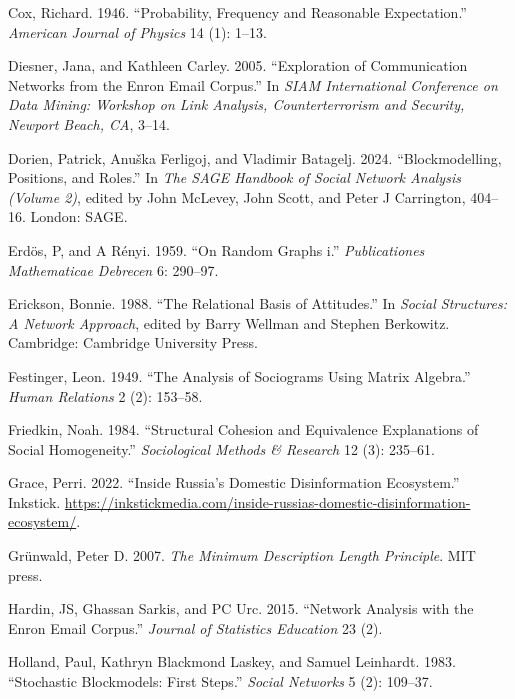 \documentclass[
  12pt,
  a4paper,
  DIV=11,
  numbers=noendperiod,
  twoside,
  open=any]{scrartcl}
\newlength{\cslhangindent}
\newenvironment{CSLReferences}[2] %
 {\begin{list}{}{%
  \setlength{\itemindent}{0pt}
  \setlength{\leftmargin}{0pt}
  \setlength{\parsep}{0pt}
  \ifodd #1
   \setlength{\leftmargin}{\cslhangindent}
   \setlength{\itemindent}{-1\cslhangindent}
  \fi
  \setlength{\itemsep}{#2\baselineskip}}}
 {\end{list}}
\begin{document}
\begin{CSLReferences}{1}{0}
Cox, Richard. 1946. {``Probability, Frequency and Reasonable
Expectation.''} \emph{American Journal of Physics} 14 (1): 1--13.

Diesner, Jana, and Kathleen Carley. 2005. {``Exploration of
Communication Networks from the Enron Email Corpus.''} In \emph{SIAM
International Conference on Data Mining: Workshop on Link Analysis,
Counterterrorism and Security, Newport Beach, CA}, 3--14.

Dorien, Patrick, Anuška Ferligoj, and Vladimir Batagelj. 2024.
{``Blockmodelling, Positions, and Roles.''} In \emph{The SAGE Handbook
of Social Network Analysis (Volume 2)}, edited by John McLevey, John
Scott, and Peter J Carrington, 404--16. London: SAGE.

Erdös, P, and A Rényi. 1959. {``On Random Graphs i.''}
\emph{Publicationes Mathematicae Debrecen} 6: 290--97.

Erickson, Bonnie. 1988. {``The Relational Basis of Attitudes.''} In
\emph{Social Structures: A Network Approach}, edited by Barry Wellman
and Stephen Berkowitz. Cambridge: Cambridge University Press.

Festinger, Leon. 1949. {``The Analysis of Sociograms Using Matrix
Algebra.''} \emph{Human Relations} 2 (2): 153--58.

Friedkin, Noah. 1984. {``Structural Cohesion and Equivalence
Explanations of Social Homogeneity.''} \emph{Sociological Methods \&
Research} 12 (3): 235--61.

Grace, Perri. 2022. {``Inside Russia's Domestic Disinformation
Ecosystem.''} Inkstick.
\url{https://inkstickmedia.com/inside-russias-domestic-disinformation-ecosystem/}.

Grünwald, Peter D. 2007. \emph{The Minimum Description Length
Principle}. MIT press.

Hardin, JS, Ghassan Sarkis, and PC Urc. 2015. {``Network Analysis with
the Enron Email Corpus.''} \emph{Journal of Statistics Education} 23
(2).

Holland, Paul, Kathryn Blackmond Laskey, and Samuel Leinhardt. 1983.
{``Stochastic Blockmodels: First Steps.''} \emph{Social Networks} 5 (2):
109--37.


\end{CSLReferences}
\end{document}
